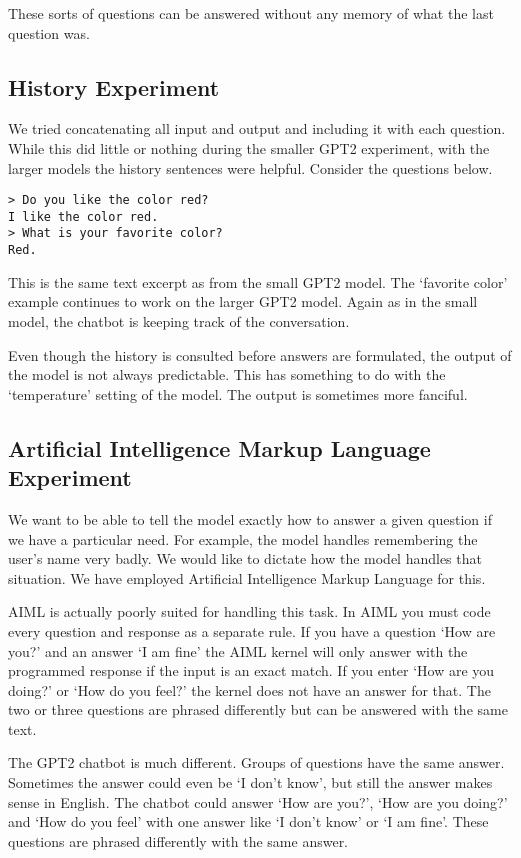 These sorts of questions can be answered without any memory of what the last question was.

\subsection{History Experiment}

We tried concatenating all input and output and including it with each question. While this did little or nothing during the smaller GPT2 experiment, with the larger models the history sentences were helpful. Consider the questions below.
\begin{verbatim}
> Do you like the color red?
I like the color red.
> What is your favorite color?
Red.
\end{verbatim}
This is the same text excerpt as from the small GPT2 model. The `favorite color' example continues to work on the larger GPT2 model. Again as in the small model, the chatbot is keeping track of the conversation. 

Even though the history is consulted before answers are formulated, the output of the model is not always predictable. This has something to do with the `temperature' setting of the model. The output is sometimes more fanciful.


\subsection{Artificial Intelligence Markup Language Experiment}

We want to be able to tell the model exactly how to answer a given question if we have a particular need. For example, the model handles remembering the user's name very badly. We would like to dictate how the model handles that situation. We have employed Artificial Intelligence Markup Language for this. 

AIML is actually poorly suited for handling this task. In AIML you must code every question and response as a separate rule. If you have a question `How are you?' and an answer `I am fine' the AIML kernel will only answer with the programmed response if the input is an exact match. If you enter `How are you doing?' or `How do you feel?' the kernel does not have an answer for that. The two or three questions are phrased differently but can be answered with the same text.

The GPT2 chatbot is much different. Groups of questions have the same answer. Sometimes the answer could even be `I don't know', but still the answer makes sense in English. The chatbot could answer `How are you?', `How are you doing?' and `How do you feel' with one answer like `I don't know' or `I am fine'. These questions are phrased differently with the same answer.

